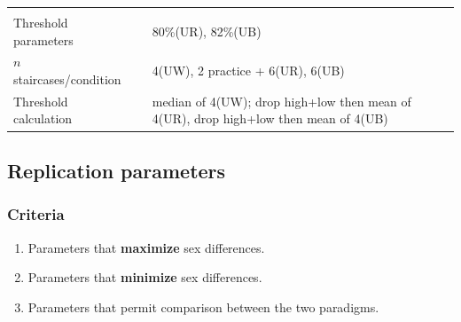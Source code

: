 \documentclass[]{article}
\providecommand{\tightlist}{%
  \setlength{\itemsep}{0pt}\setlength{\parskip}{0pt}}
\begin{document}
\begin{longtable}[]{@{}lll@{}}
\begin{minipage}[t]{0.11\columnwidth}
\end{minipage}\tabularnewline
\begin{minipage}[t]{0.15\columnwidth}\raggedright\strut
Threshold parameters\strut
\end{minipage} & \begin{minipage}[t]{0.13\columnwidth}\raggedright\strut
\strut
\end{minipage} & \begin{minipage}[t]{0.11\columnwidth}\raggedright\strut
80\%(UR), 82\%(UB)\strut
\end{minipage}\tabularnewline
\begin{minipage}[t]{0.15\columnwidth}\raggedright\strut
\(n\) staircases/condition\strut
\end{minipage} & \begin{minipage}[t]{0.13\columnwidth}\raggedright\strut
\strut
\end{minipage} & \begin{minipage}[t]{0.11\columnwidth}\raggedright\strut
4(UW), 2 practice + 6(UR), 6(UB)\strut
\end{minipage}\tabularnewline
\begin{minipage}[t]{0.15\columnwidth}\raggedright\strut
Threshold calculation\strut
\end{minipage} & \begin{minipage}[t]{0.13\columnwidth}\raggedright\strut
\strut
\end{minipage} & \begin{minipage}[t]{0.11\columnwidth}\raggedright\strut
median of 4(UW); drop high+low then mean of 4(UR), drop high+low then
mean of 4(UB)\strut
\end{minipage}\tabularnewline
\bottomrule
\end{longtable}

\subsection{Replication parameters}\label{replication-parameters}

\subsubsection{Criteria}\label{criteria}

\begin{enumerate}
\def\labelenumi{\arabic{enumi}.}
\tightlist
\item
  Parameters that \textbf{maximize} sex differences.
\item
  Parameters that \textbf{minimize} sex differences.
\item
  Parameters that permit comparison between the two paradigms.
\end{enumerate}
\end{document}
